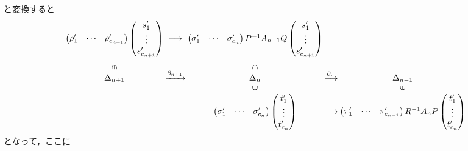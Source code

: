 \documentclass[uplatex]{jsarticle}
\begin{document}
と変換すると
\begin{equation}
  \begin{array}{c@{\:}c@{\:}c@{\:}c@{\:}c}
    \begin{pmatrix}
      \rho'_{1} & \cdots & \rho'_{c_{n+1}}
    \end{pmatrix}
    \begin{pmatrix}
      s'_{1} \\ \vdots \\ s'_{c_{n+1}}
    \end{pmatrix}
    & \longmapsto &
    \begin{pmatrix}
      \sigma'_{1} & \cdots & \sigma'_{c_{n}}
    \end{pmatrix}
    P^{-1}A_{n+1}Q
    \begin{pmatrix}
      s'_{1} \\ \vdots \\ s'_{c_{n+1}}
    \end{pmatrix} \\
    \rotatebox{270}{$\in$} & & \rotatebox{270}{$\in$} \\
    \Delta_{n+1} & \xrightarrow{\partial_{n+1}} & \Delta_{n} & \xrightarrow{\partial_{n}} & \Delta_{n-1} \\
    & & \vin & & \vin \\
    & & \begin{pmatrix}
      \sigma'_{1} & \cdots & \sigma'_{c_{n}}
    \end{pmatrix}
    \begin{pmatrix}
      t'_{1} \\ \vdots \\ t'_{c_{n}}
    \end{pmatrix}
    & \longmapsto &
    \begin{pmatrix}
      \pi'_{1} & \cdots & \pi'_{c_{n-1}}
    \end{pmatrix}
    R^{-1}A_{n}P
    \begin{pmatrix}
      t'_{1} \\ \vdots \\ t'_{c_{n}}
    \end{pmatrix} \\
  \end{array}
\end{equation}
となって，ここに
\end{document}
